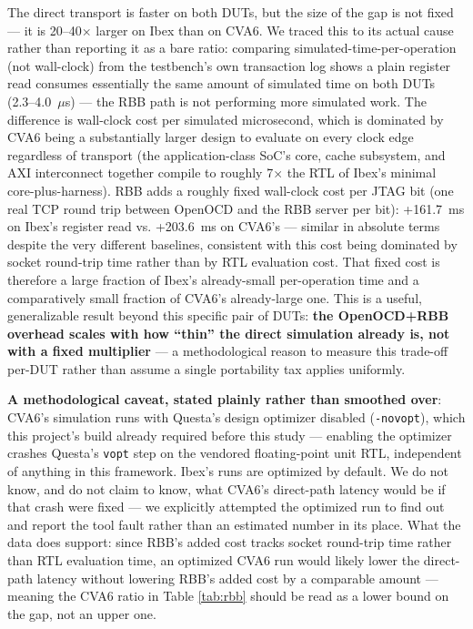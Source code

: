 \documentclass[conference]{IEEEtran}
\begin{document}
The direct transport is faster on both DUTs, but the size of the gap is not fixed --- it is 20--40$\times$ larger on Ibex than on CVA6. We traced this to its actual cause rather than reporting it as a bare ratio: comparing simulated-time-per-operation (not wall-clock) from the testbench's own transaction log shows a plain register read consumes essentially the same amount of simulated time on both DUTs (2.3--4.0~$\mu$s) --- the RBB path is not performing more simulated work. The difference is wall-clock cost per simulated microsecond, which is dominated by CVA6 being a substantially larger design to evaluate on every clock edge regardless of transport (the application-class SoC's core, cache subsystem, and AXI interconnect together compile to roughly 7$\times$ the RTL of Ibex's minimal core-plus-harness). RBB adds a roughly fixed wall-clock cost per JTAG bit (one real TCP round trip between OpenOCD and the RBB server per bit): +161.7~ms on Ibex's register read vs. +203.6~ms on CVA6's --- similar in absolute terms despite the very different baselines, consistent with this cost being dominated by socket round-trip time rather than by RTL evaluation cost. That fixed cost is therefore a large fraction of Ibex's already-small per-operation time and a comparatively small fraction of CVA6's already-large one. This is a useful, generalizable result beyond this specific pair of DUTs: \textbf{the OpenOCD+RBB overhead scales with how ``thin'' the direct simulation already is, not with a fixed multiplier} --- a methodological reason to measure this trade-off per-DUT rather than assume a single portability tax applies uniformly.

\textbf{A methodological caveat, stated plainly rather than smoothed over}: CVA6's simulation runs with Questa's design optimizer disabled (\texttt{-novopt}), which this project's build already required before this study --- enabling the optimizer crashes Questa's \texttt{vopt} step on the vendored floating-point unit RTL, independent of anything in this framework. Ibex's runs are optimized by default. We do not know, and do not claim to know, what CVA6's direct-path latency would be if that crash were fixed --- we explicitly attempted the optimized run to find out and report the tool fault rather than an estimated number in its place. What the data does support: since RBB's added cost tracks socket round-trip time rather than RTL evaluation time, an optimized CVA6 run would likely lower the direct-path latency without lowering RBB's added cost by a comparable amount --- meaning the CVA6 ratio in Table \ref{tab:rbb} should be read as a lower bound on the gap, not an upper one.
\end{document}
